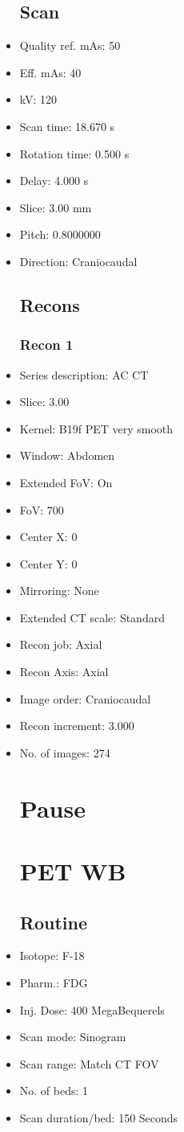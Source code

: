 \documentclass[12pt]{article}
\begin{document}
\begin{itemize}[noitemsep]
\subsection{Scan}
\item Quality ref. mAs: 50\item Eff. mAs: 40\item kV: 120\item Scan time: 18.670 s\item Rotation time: 0.500 s\item Delay: 4.000 s\item Slice: 3.00 mm\item Pitch: 0.8000000\item Direction: Craniocaudal\subsection{Recons}

\subsubsection{Recon 1}
\item Series description: AC CT
\item Slice: 3.00
\item Kernel: B19f PET very smooth
\item Window: Abdomen
\item Extended FoV: On
\item FoV: 700
\item Center X: 0
\item Center Y: 0
\item Mirroring: None
\item Extended CT scale: Standard
\item Recon job: Axial
\item Recon Axis: Axial
\item Image order: Craniocaudal
\item Recon increment: 3.000
\item No. of images: 274
\section{Pause}
\section{PET WB}\subsection{Routine}
\item Isotope: F-18
\item Pharm.: FDG
\item Inj. Dose: 400 MegaBequerels
\item Scan mode: Sinogram
\item Scan range: Match CT FOV
\item No. of beds: 1
\item Scan duration/bed: 150 Seconds

\end{itemize}
\end{document}
